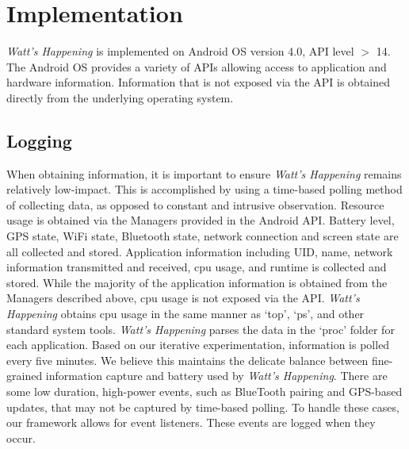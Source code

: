 \section{Implementation}
\label{sec:implementation}
\emph{Watt's Happening} is implemented on Android OS version 4.0, API level $>$ 14. 
The Android OS provides a variety of APIs allowing access to application and hardware information.
Information that is not exposed via the API is obtained directly from the underlying operating system.

\subsection{Logging}
\label{subsec:impl_logging}
When obtaining information, it is important to ensure \emph{Watt's Happening} remains relatively low-impact.
This is accomplished by using a time-based polling method of collecting data, as opposed to constant and intrusive observation.
Resource usage is obtained via the Managers provided in the Android API.
Battery level, GPS state, WiFi state, Bluetooth state, network connection and screen state are all collected and stored.
Application information including UID, name, network information transmitted and received, cpu usage, and runtime is collected and stored. 
While the majority of the application information is obtained from the Managers described above, cpu usage is not exposed via the API.
\emph{Watt's Happening} obtains cpu usage in the same manner as `top', `ps', and other standard system tools.
\emph{Watt's Happening} parses the data in the `proc' folder for each application.
Based on our iterative experimentation, information is polled every five minutes.
We believe this maintains the delicate balance between fine-grained information capture and battery used by \emph{Watt's Happening}.
There are some low duration, high-power events, such as BlueTooth pairing and GPS-based updates, that may not be captured by time-based polling.
To handle these cases, our framework allows for event listeners.
These events are logged when they occur. 


